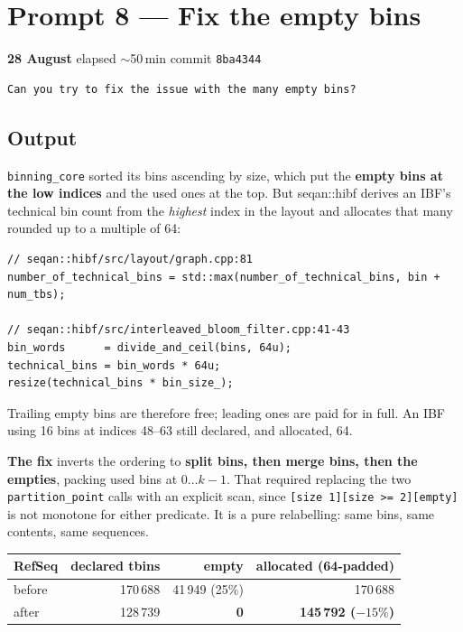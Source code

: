 \documentclass[11pt,a4paper]{article}
\newenvironment{promptbox}{\medskip}{\medskip}
\newcommand{\code}[1]{\lstinline[basicstyle=\ttfamily\small]!#1!}
\newcommand{\sha}[1]{\texttt{#1}}
\newcommand{\good}[1]{\textcolor{okgreen}{\textbf{#1}}}
\newcommand{\bad}[1]{\textcolor{warn}{#1}}
\begin{document}
\section{Prompt 8 --- Fix the empty bins}
\textbf{28 August} \textperiodcentered{} elapsed ${\sim}$50\,min \textperiodcentered{} commit \sha{8ba4344}
\begin{promptbox}
\begin{lstlisting}[style=promptstyle]
Can you try to fix the issue with the many empty bins?
\end{lstlisting}
\end{promptbox}
\subsection*{Output}

\code{binning_core} sorted its bins ascending by size, which put the \textbf{empty bins at the low
indices} and the used ones at the top. But seqan::hibf derives an IBF's technical bin count from
the \emph{highest} index in the layout and allocates that many rounded up to a multiple of 64:

\begin{lstlisting}[style=codestyle]
// seqan::hibf/src/layout/graph.cpp:81
number_of_technical_bins = std::max(number_of_technical_bins, bin + num_tbs);

// seqan::hibf/src/interleaved_bloom_filter.cpp:41-43
bin_words      = divide_and_ceil(bins, 64u);
technical_bins = bin_words * 64u;
resize(technical_bins * bin_size_);
\end{lstlisting}

\noindent Trailing empty bins are therefore free; leading ones are paid for in full. An IBF using
16 bins at indices 48--63 still declared, and allocated, 64.

\medskip\noindent\textbf{The fix} inverts the ordering to \textbf{split bins, then merge bins, then
the empties}, packing used bins at $0 \ldots k-1$. That required replacing the two
\code{partition_point} calls with an explicit scan, since \texttt{[size 1][size >= 2][empty]} is not
monotone for either predicate. It is a pure relabelling: same bins, same contents, same sequences.

\begin{longtable}{@{}lrrr@{}}
\toprule
\textbf{RefSeq} & \textbf{declared tbins} & \textbf{empty} & \textbf{allocated (64-padded)} \\
\midrule
before & 170\,688 & \bad{41\,949 (25\%)} & 170\,688 \\
after  & 128\,739 & \good{0}             & \good{145\,792 ($-15\%$)} \\
\bottomrule
\end{longtable}
\end{document}
